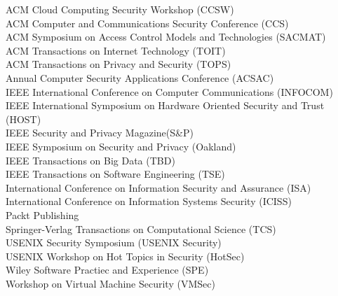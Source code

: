 \documentclass[10pt]{article}
\begin{document}
\begin{itemize}
    ACM Cloud Computing Security Workshop (CCSW)\\
    ACM Computer and Communications Security Conference (CCS)\\
    ACM Symposium on Access Control Models and Technologies (SACMAT)\\
    ACM Transactions on Internet Technology (TOIT)\\
    ACM Transactions on Privacy and Security (TOPS)\\
    Annual Computer Security Applications Conference (ACSAC)\\
    IEEE International Conference on Computer Communications (INFOCOM)\\
    IEEE International Symposium on Hardware Oriented Security and Trust (HOST)\\
    IEEE Security and Privacy Magazine(S\&P)\\
    IEEE Symposium on Security and Privacy (Oakland)\\
    IEEE Transactions on Big Data (TBD)\\
    IEEE Transactions on Software Engineering (TSE)\\
    International Conference on Information Security and Assurance (ISA)\\
    International Conference on Information Systems Security (ICISS)\\
    Packt Publishing\\
    Springer-Verlag Transactions on Computational Science (TCS)\\
    USENIX Security Symposium (USENIX Security)\\
    USENIX Workshop on Hot Topics in Security (HotSec)\\
    Wiley Software Practiec and Experience (SPE)\\
    Workshop on Virtual Machine Security (VMSec)

\end{itemize}

\begin{comment}
\vspace{1em} {\Large \textbf{COMPUTING SKILLS}}
\begin{itemize}
\item \textbf{Programming Languages} - C, C++, Java, Python, Perl, PHP, JavaScript
\item \textbf{Operating Systems} - Linux, IBM AIX, MS Windows, Sun Solaris, Mac
\item \textbf{Other Applications} - Matlab, Maxima, Maple, Mathematica

\end{itemize}
\end{comment}
\end{document}
